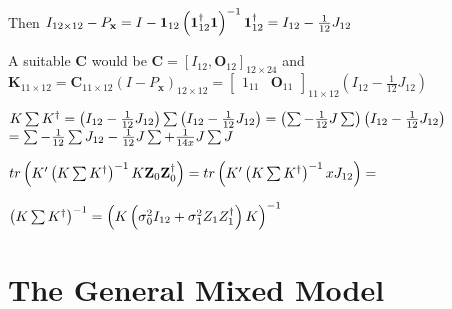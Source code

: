 \documentclass{article}
\begin{document}
\bigskip

Then $I_{12\times 12}-P_{\mathbf{x}}=I-\boldsymbol{1}_{12}\left( \boldsymbol{%
1}_{12}^{\dagger }\boldsymbol{1}\right) ^{-1}\boldsymbol{1}_{12}^{\dagger
}=I_{12}-\frac{1}{12}J_{12}$

\bigskip 

A suitable $\mathbf{C}$ would be $\mathbf{C}=\left[ I_{12},\mathbf{O}_{12}%
\right] _{12\times 24}$ and\newline
$\mathbf{K}_{11\times 12}=\mathbf{C}_{11\times 12}\left( I-P_{\mathbf{x}%
}\right) _{12\times 12}=\left[ 
\begin{array}{cc}
1_{11} & \mathbf{O}_{11}%
\end{array}%
\right] _{11\times 12}\left( I_{12}-\frac{1}{12}J_{12}\right) $

\bigskip

$K\mathop{\textstyle \sum } K^{\dagger }=\left( I_{12}-\frac{1}{12}J_{12}\right) \mathop{\textstyle \sum } \left(
I_{12}-\frac{1}{12}J_{12}\right) =\left( \mathop{\textstyle \sum } -\frac{1}{12}J\mathop{\textstyle \sum } \right)
\left( I_{12}-\frac{1}{12}J_{12}\right) $\newline
$=\mathop{\textstyle \sum } -\frac{1}{12}\mathop{\textstyle \sum } J_{12}-\frac{1}{12}J\mathop{\textstyle \sum } +\frac{1}{14x}J\mathop{\textstyle \sum } J$

\bigskip

$tr\left( K^{\prime }\left( K\tsum K^{\dagger }\right) ^{-1}K\mathbf{Z}_{0}%
\mathbf{Z}_{0}^{\dagger }\right) =tr\left( K^{\prime }\left( K\tsum
K^{\dagger }\right) ^{-1}xJ_{12}\right) =$

$\left( K\tsum K^{\dagger }\right) ^{-1}=\left( K\left( \sigma
_{0}^{2}I_{12}+\sigma _{1}^{2}Z_{1}Z_{1}^{\dagger }\right) K\right) ^{-1}$

\bigskip

\bigskip

\section{The General Mixed Model}

\bigskip
\end{document}
